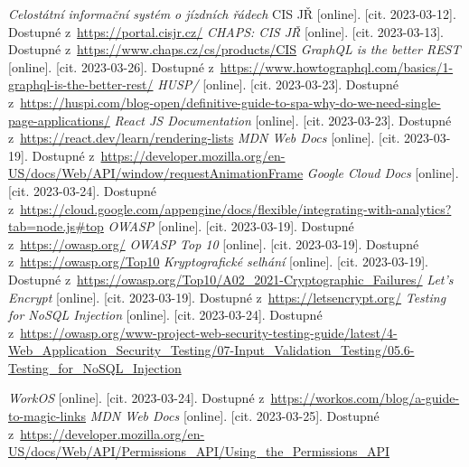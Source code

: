 \begin{thebibliography}{99}
     \textit{Celostátní informační systém o jízdních řádech} CIS JŘ [online]. [cit. 2023-03-12]. Dostupné z~\url{https://portal.cisjr.cz/}
     \textit{CHAPS: CIS JŘ} [online]. [cit. 2023-03-13]. Dostupné z~\url{https://www.chaps.cz/cs/products/CIS}
     \textit{GraphQL is the better REST} [online]. [cit. 2023-03-26]. Dostupné z~\url{https://www.howtographql.com/basics/1-graphql-is-the-better-rest/}
     \textit{HUSP/} [online]. [cit. 2023-03-23]. Dostupné z~\url{https://huspi.com/blog-open/definitive-guide-to-spa-why-do-we-need-single-page-applications/}
     \textit{React JS Documentation} [online]. [cit. 2023-03-23]. Dostupné z~\url{https://react.dev/learn/rendering-lists}
     \textit{MDN Web Docs} [online]. [cit. 2023-03-19]. Dostupné z~\url{https://developer.mozilla.org/en-US/docs/Web/API/window/requestAnimationFrame}
     \textit{Google Cloud Docs} [online]. [cit. 2023-03-24]. Dostupné z~\url{https://cloud.google.com/appengine/docs/flexible/integrating-with-analytics?tab=node.js#top}
     \textit{OWASP} [online]. [cit. 2023-03-19]. Dostupné z~\url{https://owasp.org/}
     \textit{OWASP Top 10} [online]. [cit. 2023-03-19]. Dostupné z~\url{https://owasp.org/Top10}
     \textit{Kryptografické selhání} [online]. [cit. 2023-03-19]. Dostupné z~\url{https://owasp.org/Top10/A02_2021-Cryptographic_Failures/}
     \textit{Let's Encrypt} [online]. [cit. 2023-03-19]. Dostupné z~\url{https://letsencrypt.org/}
     \textit{Testing for NoSQL Injection} [online]. [cit. 2023-03-24]. Dostupné z~\url{https://owasp.org/www-project-web-security-testing-guide/latest/4-Web_Application_Security_Testing/07-Input_Validation_Testing/05.6-Testing_for_NoSQL_Injection}

     \textit{WorkOS} [online]. [cit. 2023-03-24]. Dostupné z~\url{https://workos.com/blog/a-guide-to-magic-links}
     \textit{MDN Web Docs} [online]. [cit. 2023-03-25]. Dostupné z~\url{https://developer.mozilla.org/en-US/docs/Web/API/Permissions_API/Using_the_Permissions_API}

\end{thebibliography}
